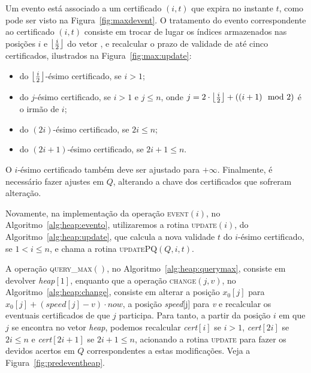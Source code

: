 Um evento está associado a um certificado $(i, t)$ que expira no instante $t$,
como pode ser visto na Figura~\ref{fig:maxdevent}.
O tratamento do evento correspondente ao certificado $(i, t)$ consiste em trocar de lugar os
índices armazenados nas posições $i$ e $\left\lfloor \frac{i}{2} \right\rfloor$ do vetor \heap, e recalcular o prazo
de validade de até cinco certificados, ilustrados na Figura~\ref{fig:max:update}:
\begin{itemize}
    \item do $\left\lfloor \frac{i}{2} \right\rfloor$-ésimo certificado, se $i > 1$;
    \item do $j$-ésimo certificado, se $i > 1$ e $j \leq n$,
    onde $j = 2\cdot \left\lfloor \frac{i}{2} \right\rfloor + ((i + 1)\mod2)$
    é o irmão de $i$;
    \item do $(2i)$-ésimo certificado, se $2i \leq n$;
    \item do $(2i + 1)$-ésimo certificado, se $2i + 1 \leq n$.
\end{itemize}



O $i$-ésimo certificado também deve ser ajustado para $+\infty$.
Finalmente, é necessário fazer ajustes em $Q$, alterando a chave dos certificados que sofreram
alteração.

%

Novamente, na implementação da operação \textsc{event}$(i)$, no Algoritmo~\ref{alg:heap:evento},
utilizaremos a rotina \textsc{update}$(i)$, do Algoritmo~\ref{alg:heap:update}, que calcula a nova
validade $t$ do $i$-ésimo certificado, se $1 < i \leq n$, e chama a rotina \textsc{updatePQ}$(Q, i,
t)$.





A operação \textsc{query\_max}$()$, no Algoritmo~\ref{alg:heap:querymax},
consiste em devolver \textit{heap}$[1]$, enquanto que a operação
\textsc{change}$(j, v)$, no Algoritmo~\ref{alg:heap:change}, consiste em alterar
a posição $x_0[j]$ para ${x_0[j] + (\mathit{speed}[j] - v)\cdot now}$, a posição
\textit{speed}[j] para \textit{v} e recalcular os eventuais certificados de que
$j$ participa.
Para tanto, a partir da posição $i$ em que $j$ se encontra no vetor \textit{heap}, podemos
recalcular \textit{cert}$[i]$ se $i > 1$, \textit{cert}$[2i]$ se $2i \leq n$ e \textit{cert}$[2i +
1]$ se $2i + 1 \leq n$, acionando a rotina \textsc{update} para fazer os devidos acertos em $Q$
correspondentes a estas modificações.
Veja a Figura~\ref{fig:predeventheap}.

